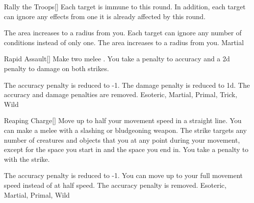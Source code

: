 \lowercase{\hypertarget{maneuver:Rally the Troops}{}}\label{maneuver:Rally the Troops}
\hypertarget{maneuver:Rally the Troops}{}
\begin{freeability}[Rank 1]{Rally the Troops}[]
Each target is immune to  this round.
In addition, each target can ignore any effects from one  it is already affected by this round.

\rankline
{} The area increases to a \arealarge radius from you.
 Each target can ignore any number of conditions instead of only one.
 The area increases to a \areahuge radius from you.
 Martial
\end{freeability}
\vspace{0.25em}



\lowercase{\hypertarget{maneuver:Rapid Assault}{}}\label{maneuver:Rapid Assault}
\hypertarget{maneuver:Rapid Assault}{}
\begin{freeability}[Rank 1]{Rapid Assault}[]
Make two melee .
You take a  penalty to accuracy and a \minus2d penalty to damage on both strikes.

\rankline
{} The accuracy penalty is reduced to -1.
 The damage penalty is reduced to \minus1d.
 The accuracy and damage penalties are removed.
 Esoteric, Martial, Primal, Trick, Wild
\end{freeability}
\vspace{0.25em}



\lowercase{\hypertarget{maneuver:Reaping Charge}{}}\label{maneuver:Reaping Charge}
\hypertarget{maneuver:Reaping Charge}{}
\begin{freeability}[Rank 1]{Reaping Charge}[]
Move up to half your movement speed in a straight line.
You can make a melee  with a slashing or bludgeoning weapon.
The strike targets any number of creatures and objects that you  at any point during your movement, except for the space you start in and the space you end in.
You take a  penalty to  with the strike.

\rankline
{} The accuracy penalty is reduced to -1.
 You can move up to your full movement speed instead of at half speed.
 The accuracy penalty is removed.
 Esoteric, Martial, Primal, Wild
\end{freeability}
\vspace{0.25em}



